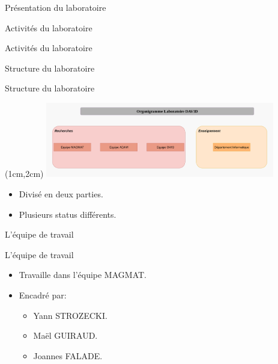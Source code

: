 \documentclass[10 pt]{beamer}
\begin{document}
\begin{section}{Pr\'esentation du laboratoire}
\begin{subsection}{Activit\'es du laboratoire}
\begin{frame}{Activit\'es du laboratoire}
\end{frame}
\end{subsection}


\begin{subsection}{Structure du laboratoire}
\begin{frame}{Structure du laboratoire}


\begin{textblock*}{10cm}(1cm,2cm) %
\includegraphics [width=10cm]{Organigramme_DAVID.png}
\end{textblock*}
\vspace{3cm}
 \begin{multicols}{2}
\begin{itemize}

\item Divis\'e en deux parties.
\item Plusieurs status diff\'erents.

\end{itemize}
\end{multicols}


\end{frame}
\end{subsection}

\begin{subsection}{L'\'equipe de travail}
\begin{frame}{L'\'equipe de travail}

\begin{itemize}
\item Travaille dans l'\'equipe MAGMAT.
\vspace{0,5cm}
\item Encadr\'e par:
\begin{itemize}
\vspace{0,30cm}
\item Yann STROZECKI.
\vspace{0,30cm}
\item Ma\"el GUIRAUD.
\vspace{0,30cm}
\item Joannes FALADE.
\end{itemize}
\end{itemize}


\end{frame}
\end{subsection}

\end{section}
\end{document}
